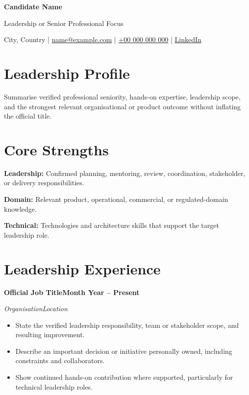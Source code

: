 \documentclass[10pt,a4paper]{article}
\newcommand{\role}[4]{%
  {\large\bfseries #1}\hfill\textbf{#2}\par
  \textit{#3}\hfill\textit{#4}\par\vspace{-2pt}
}
\begin{document}
\color{text}
\raggedright

\begin{center}
  {\fontsize{24}{27}\selectfont\bfseries Candidate Name}\par
  \vspace{1pt}
  {\large\color{accent}Leadership or Senior Professional Focus}\par
  \vspace{3pt}
  City, Country \enspace|\enspace
  \href{mailto:name@example.com}{name@example.com} \enspace|\enspace
  \href{tel:+00000000000}{+00 000 000 000} \enspace|\enspace
  \href{https://www.linkedin.com/}{LinkedIn}
\end{center}

\section{Leadership Profile}
Summarise verified professional seniority, hands-on expertise, leadership scope, and the strongest relevant organisational or product outcome without inflating the official title.

\section{Core Strengths}
\textbf{Leadership:} Confirmed planning, mentoring, review, coordination, stakeholder, or delivery responsibilities.\par
\textbf{Domain:} Relevant product, operational, commercial, or regulated-domain knowledge.\par
\textbf{Technical:} Technologies and architecture skills that support the target leadership role.

\section{Leadership Experience}
\role{Official Job Title}{Month Year -- Present}{Organisation}{Location}
\begin{itemize}
  \item State the verified leadership responsibility, team or stakeholder scope, and resulting improvement.
  \item Describe an important decision or initiative personally owned, including constraints and collaborators.
  \item Show continued hands-on contribution where supported, particularly for technical leadership roles.
\end{itemize}
\end{document}
